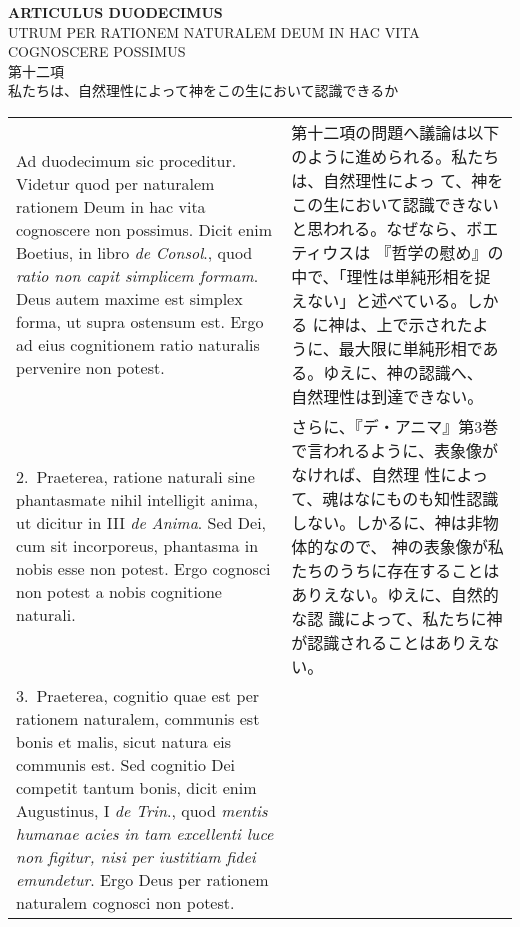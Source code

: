 \documentclass[10pt]{jsarticle} %
\begin{document}
\newpage
{}

\begin{center}
 {\Large {\bf ARTICULUS DUODECIMUS}}\\
{\large UTRUM PER RATIONEM NATURALEM DEUM IN HAC VITA\\COGNOSCERE POSSIMUS}\\
{\large 第十二項\\私たちは、自然理性によって神をこの生において認識できるか}

\end{center}


\begin{longtable}{p{21em}p{21em}}

{\sc  Ad duodecimum sic proceditur}. Videtur quod per naturalem rationem
Deum in hac vita cognoscere non possimus. Dicit enim Boetius, in libro
{\it de Consol}., quod {\it ratio non capit simplicem formam}. Deus
autem maxime est simplex forma, ut supra ostensum est. Ergo ad eius
cognitionem ratio naturalis pervenire non potest.

&

第十二項の問題へ議論は以下のように進められる。私たちは、自然理性によっ
て、神をこの生において認識できないと思われる。なぜなら、ボエティウスは
『哲学の慰め』の中で、「理性は単純形相を捉えない」と述べている。しかる
に神は、上で示されたように、最大限に単純形相である。ゆえに、神の認識へ、
自然理性は到達できない。

\\



2.~{\sc  Praeterea}, ratione naturali sine phantasmate nihil
intelligit anima, ut dicitur in III {\it de Anima}. Sed Dei, cum sit
incorporeus, phantasma in nobis esse non potest. Ergo cognosci non
potest a nobis cognitione naturali.

&

さらに、『デ・アニマ』第3巻で言われるように、表象像がなければ、自然理
性によって、魂はなにものも知性認識しない。しかるに、神は非物体的なので、
神の表象像が私たちのうちに存在することはありえない。ゆえに、自然的な認
識によって、私たちに神が認識されることはありえない。

\\



3.~{\sc Praeterea}, cognitio quae est per rationem naturalem, communis
est bonis et malis, sicut natura eis communis est. Sed cognitio Dei
competit tantum bonis, dicit enim Augustinus, I {\it de Trin}., quod
{\it mentis humanae acies in tam excellenti luce non figitur, nisi per
iustitiam fidei emundetur}. Ergo Deus per rationem naturalem cognosci
non potest.



\end{longtable}
\end{document}
